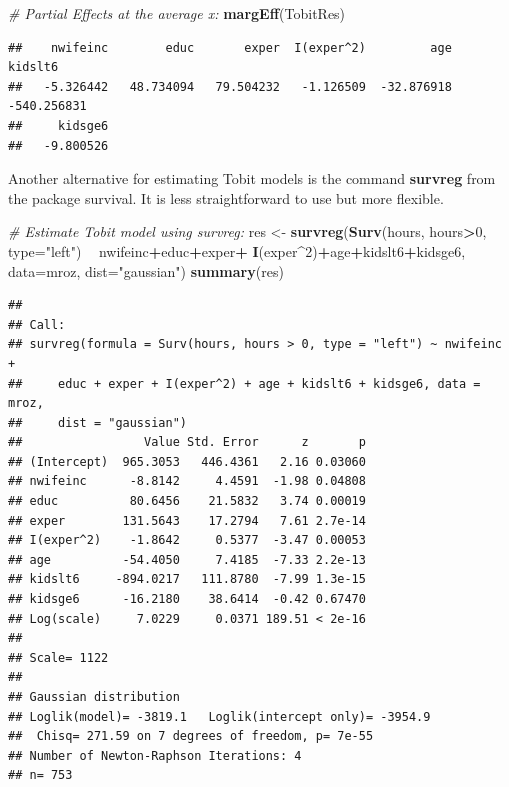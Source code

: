 \documentclass[]{book}
\newenvironment{Shaded}{\begin{snugshade}}{\end{snugshade}}
\newcommand{\CommentTok}[1]{\textcolor[rgb]{0.56,0.35,0.01}{\textit{#1}}}
\newcommand{\DataTypeTok}[1]{\textcolor[rgb]{0.13,0.29,0.53}{#1}}
\newcommand{\DecValTok}[1]{\textcolor[rgb]{0.00,0.00,0.81}{#1}}
\newcommand{\KeywordTok}[1]{\textcolor[rgb]{0.13,0.29,0.53}{\textbf{#1}}}
\newcommand{\NormalTok}[1]{#1}
\newcommand{\OperatorTok}[1]{\textcolor[rgb]{0.81,0.36,0.00}{\textbf{#1}}}
\newcommand{\StringTok}[1]{\textcolor[rgb]{0.31,0.60,0.02}{#1}}
\begin{document}
\begin{Shaded}
\begin{Highlighting}[]
\CommentTok{# Partial Effects at the average x:}
\KeywordTok{margEff}\NormalTok{(TobitRes)}
\end{Highlighting}
\end{Shaded}

\begin{verbatim}
##    nwifeinc        educ       exper  I(exper^2)         age     kidslt6 
##   -5.326442   48.734094   79.504232   -1.126509  -32.876918 -540.256831 
##     kidsge6 
##   -9.800526
\end{verbatim}

Another alternative for estimating Tobit models is the command \textbf{survreg} from the package survival. It is less straightforward to use but more flexible.

\begin{Shaded}
\begin{Highlighting}[]
\CommentTok{# Estimate Tobit model using survreg:}
\NormalTok{res <-}\StringTok{ }\KeywordTok{survreg}\NormalTok{(}\KeywordTok{Surv}\NormalTok{(hours, hours}\OperatorTok{>}\DecValTok{0}\NormalTok{, }\DataTypeTok{type=}\StringTok{"left"}\NormalTok{) }\OperatorTok{~}\StringTok{ }\NormalTok{nwifeinc}\OperatorTok{+}\NormalTok{educ}\OperatorTok{+}\NormalTok{exper}\OperatorTok{+}
\StringTok{                 }\KeywordTok{I}\NormalTok{(exper}\OperatorTok{^}\DecValTok{2}\NormalTok{)}\OperatorTok{+}\NormalTok{age}\OperatorTok{+}\NormalTok{kidslt6}\OperatorTok{+}\NormalTok{kidsge6, }\DataTypeTok{data=}\NormalTok{mroz, }\DataTypeTok{dist=}\StringTok{"gaussian"}\NormalTok{)}
\KeywordTok{summary}\NormalTok{(res)}
\end{Highlighting}
\end{Shaded}

\begin{verbatim}
## 
## Call:
## survreg(formula = Surv(hours, hours > 0, type = "left") ~ nwifeinc + 
##     educ + exper + I(exper^2) + age + kidslt6 + kidsge6, data = mroz, 
##     dist = "gaussian")
##                 Value Std. Error      z       p
## (Intercept)  965.3053   446.4361   2.16 0.03060
## nwifeinc      -8.8142     4.4591  -1.98 0.04808
## educ          80.6456    21.5832   3.74 0.00019
## exper        131.5643    17.2794   7.61 2.7e-14
## I(exper^2)    -1.8642     0.5377  -3.47 0.00053
## age          -54.4050     7.4185  -7.33 2.2e-13
## kidslt6     -894.0217   111.8780  -7.99 1.3e-15
## kidsge6      -16.2180    38.6414  -0.42 0.67470
## Log(scale)     7.0229     0.0371 189.51 < 2e-16
## 
## Scale= 1122 
## 
## Gaussian distribution
## Loglik(model)= -3819.1   Loglik(intercept only)= -3954.9
##  Chisq= 271.59 on 7 degrees of freedom, p= 7e-55 
## Number of Newton-Raphson Iterations: 4 
## n= 753
\end{verbatim}
\end{document}
